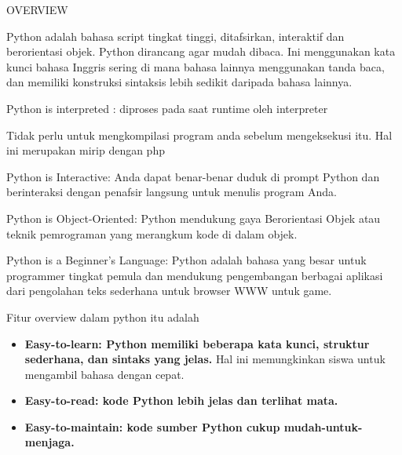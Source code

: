 \documentclass[a4paper,12pt]{report}
\begin{document}
\sloppy
{\fontsize{14pt}{14pt}\selectfont OVERVIEW \\} \par
\noindent 
{\fontsize{14pt}{14pt}\selectfont Python adalah bahasa script tingkat tinggi, ditafsirkan, interaktif dan berorientasi objek. Python dirancang agar mudah dibaca. Ini menggunakan kata kunci bahasa Inggris sering di mana bahasa lainnya menggunakan tanda baca, dan memiliki konstruksi sintaksis lebih sedikit daripada bahasa lainnya. \\} \par
\vspace{14pt}
\noindent 
{\fontsize{14pt}{14pt}\selectfont Python is interpreted : diproses pada saat runtime oleh interpreter \\} \par
\vspace{14pt}
\noindent 
{\fontsize{14pt}{14pt}\selectfont Tidak perlu untuk mengkompilasi program anda sebelum mengeksekusi itu. Hal ini merupakan mirip dengan php \\} \par
\vspace{14pt}
\noindent 
{\fontsize{14pt}{14pt}\selectfont Python is Interactive: Anda dapat benar-benar duduk di prompt Python dan berinteraksi dengan penafsir langsung untuk menulis program Anda. \\} \par
\noindent 
{\fontsize{14pt}{14pt}\selectfont Python is Object-Oriented: Python mendukung gaya Berorientasi Objek atau teknik pemrograman yang merangkum kode di dalam objek. \\} \par
\noindent 
{\fontsize{14pt}{14pt}\selectfont Python is a Beginner's Language: Python adalah bahasa yang besar untuk programmer tingkat pemula dan mendukung pengembangan berbagai aplikasi dari pengolahan teks sederhana untuk browser WWW untuk game. \\} \par
\vspace{14pt}
\noindent 
{\fontsize{14pt}{14pt}\selectfont Fitur overview dalam python itu adalah \\} \par
\vspace{14pt}
\noindent 
\begin{itemize}
\item {\fontsize{11pt}{11pt}\selectfont \textbf{Easy-to-learn: Python memiliki beberapa kata kunci, struktur sederhana, dan sintaks yang jelas.} $  $Hal ini memungkinkan siswa untuk mengambil bahasa dengan cepat.} \par
\noindent 
\item {\fontsize{11pt}{11pt}\selectfont \textbf{Easy-to-read: kode Python lebih jelas dan terlihat mata.}} \par
\noindent 
\item {\fontsize{11pt}{11pt}\selectfont \textbf{Easy-to-maintain: kode sumber Python cukup mudah-untuk-menjaga.}}\end{itemize}
\end{document}
